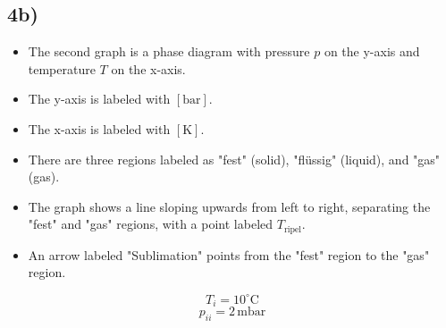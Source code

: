 

\subsection*{4b)}

\begin{itemize}
    \item The second graph is a phase diagram with pressure \( p \) on the y-axis and temperature \( T \) on the x-axis.
    \item The y-axis is labeled with \([ \text{bar} ]\).
    \item The x-axis is labeled with \([ \text{K} ]\).
    \item There are three regions labeled as "fest" (solid), "flüssig" (liquid), and "gas" (gas).
    \item The graph shows a line sloping upwards from left to right, separating the "fest" and "gas" regions, with a point labeled \( T_{\text{ripel}} \).
    \item An arrow labeled "Sublimation" points from the "fest" region to the "gas" region.
\end{itemize}

\[
T_i = 10^\circ \text{C}
\]
\[
p_{ii} = 2 \, \text{mbar}
\]